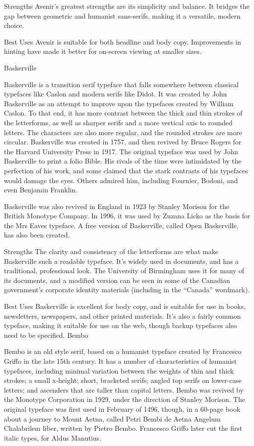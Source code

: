 \documentclass[12pt,a4paper,twocolumn]{book} %
\begin{document}
Strengths
Avenir’s greatest strengths are its simplicity and balance. It bridges the gap between geometric and humanist sans-serifs, making it a versatile, modern choice.

Best Uses
Avenir is suitable for both headline and body copy. Improvements in hinting have made it better for on-screen viewing at smaller sizes.


Baskerville

Baskerville is a transition serif typeface that falls somewhere between classical typefaces like Caslon and modern serifs like Didot. It was created by John Baskerville as an attempt to improve upon the typefaces created by William Caslon. To that end, it has more contrast between the thick and thin strokes of the letterforms, as well as sharper serifs and a more vertical axis to rounded letters. The characters are also more regular, and the rounded strokes are more circular.
Baskerville was created in 1757, and then revived by Bruce Rogers for the Harvard University Press in 1917. The original typeface was used by John Baskerville to print a folio Bible. His rivals of the time were intimidated by the perfection of his work, and some claimed that the stark contrasts of his typefaces would damage the eyes. Others admired him, including Fournier, Bodoni, and even Benjamin Franklin.

Baskerville was also revived in England in 1923 by Stanley Morison for the British Monotype Company. In 1996, it was used by Zuzana Licko as the basis for the Mrs Eaves typeface. A free version of Baskerville, called Open Baskerville, has also been created.

Strengths
The clarity and consistency of the letterforms are what make Baskerville such a readable typeface. It’s widely used in documents, and has a traditional, professional look. The University of Birmingham uses it for many of its documents, and a modified version can be seen in some of the Canadian government’s corporate identity materials (including in the “Canada” wordmark).

Best Uses
Baskerville is excellent for body copy, and is suitable for use in books, newsletters, newspapers, and other printed materials. It’s also a fairly common typeface, making it suitable for use on the web, though backup typefaces also need to be specified.
Bembo

Bembo is an old style serif, based on a humanist typeface created by Francesco Griffo in the late 15th century. It has a number of characteristics of humanist typefaces, including minimal variation between the weights of thin and thick strokes; a small x-height; short, bracketed serifs; angled top serifs on lower-case letters; and ascenders that are taller than capital letters.
Bembo was revived by the Monotype Corporation in 1929, under the direction of Stanley Morison. The original typeface was first used in February of 1496, though, in a 60-page book about a journey to Mount Aetna, called Petri Bembi de Aetna Angelum Chalabrilem liber, written by Pietro Bembo. Francesco Griffo later cut the first italic types, for Aldus Manutius.
\end{document}
